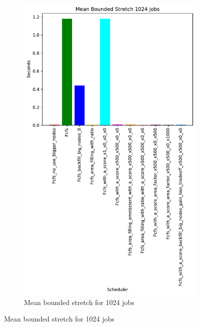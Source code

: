 \documentclass[a4paper]{article}
\begin{document}
\begin{figure}[H]
\begin{subfigure}[b]{0.4\linewidth}\centering\includegraphics[width=0.7\linewidth]{MBSS/plot/Results_Size_And_Data_2022-03-01->2022-03-03_V9271_Mean_Stretch_With_a_Minimum_1024_450_128_32_256_4_1024.pdf}\caption{Mean bounded stretch for 1024 jobs}\label{45}\end{subfigure}

\end{figure}
\end{document}
